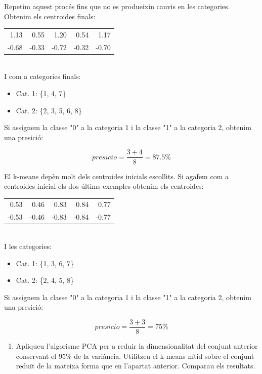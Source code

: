 \documentclass{article} %
\begin{document}
{	Repetim aquest procés fins que no es produeixin canvis en les categories. Obtenim els centroides finals: \\

	{\selectfont\small
	\begin{tabular}{r r r r r}
		1.13  & 0.55  & 1.20  & 0.54  & 1.17 \\
		-0.68 & -0.33 & -0.72 & -0.32 & -0.70 \\
	\end{tabular}
	} \\

	I com a categories finals:
	\begin{itemize}
		\item[] Cat. 1: \{1, 4, 7\}
		\item[] Cat. 2: \{2, 3, 5, 6, 8\}
	\end{itemize}

	Si assignem la classe "0" a la categoria 1 i la classe "1" a la categoria 2, obtenim una presició:

	\[presicio = \frac{3 + 4}{8} = 87.5\%\]

	El k-means depèn molt dels centroides inicials escollits. Si agafem com a centroides inicial els dos últims exemples obtenim els centroides: \\

	{\selectfont\small
	\begin{tabular}{r r r r r}
		0.53  & 0.46  & 0.83  & 0.84  & 0.77 \\
		-0.53 & -0.46 & -0.83 & -0.84 & -0.77 \\
	\end{tabular}
	} \\

	I les categories:
	\begin{itemize}
		\item[] Cat. 1: \{1, 3, 6, 7\}
		\item[] Cat. 2: \{2, 4, 5, 8\}
	\end{itemize}

	Si assignem la classe "0" a la categoria 1 i la classe "1" a la categoria 2, obtenim una presició:

	\[presicio = \frac{3 + 3}{8} = 75\%\]

}
\begin{enumerate}[resume]
	\item Apliqueu l'algorisme PCA per a reduir la dimensionalitat del conjunt anterior conservant el 95\% de la variància. Utilitzeu el k-means nítid sobre el conjunt reduït de la mateixa forma que en l'apartat anterior. Comparau els resultats.  
\end{enumerate}
\end{document}
